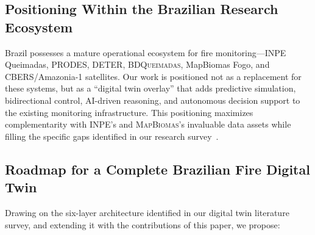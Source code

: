 \documentclass[5p,twocolumn]{elsarticle}
\newcommand{\abbrev}[1]{{\small\textsc{#1}}}
\begin{document}
\subsection{Positioning Within the Brazilian Research Ecosystem}

Brazil possesses a mature operational ecosystem for fire monitoring---\abbrev{INPE} Queimadas, \abbrev{PRODES}, \abbrev{DETER}, \abbrev{BDQueimadas}, MapBiomas Fogo, and \abbrev{CBERS}/Amazonia-1 satellites. Our work is positioned not as a replacement for these systems, but as a ``digital twin overlay'' that adds predictive simulation, bidirectional control, \abbrev{AI}-driven reasoning, and autonomous decision support to the existing monitoring infrastructure. This positioning maximizes complementarity with \abbrev{INPE}'s and \abbrev{MapBiomas}'s invaluable data assets while filling the specific gaps identified in our research survey~\cite{morsali2026,sun2024,marli2024}.

\subsection{Roadmap for a Complete Brazilian Fire Digital Twin}

Drawing on the six-layer architecture identified in our digital twin literature survey, and extending it with the contributions of this paper, we propose:
\end{document}

